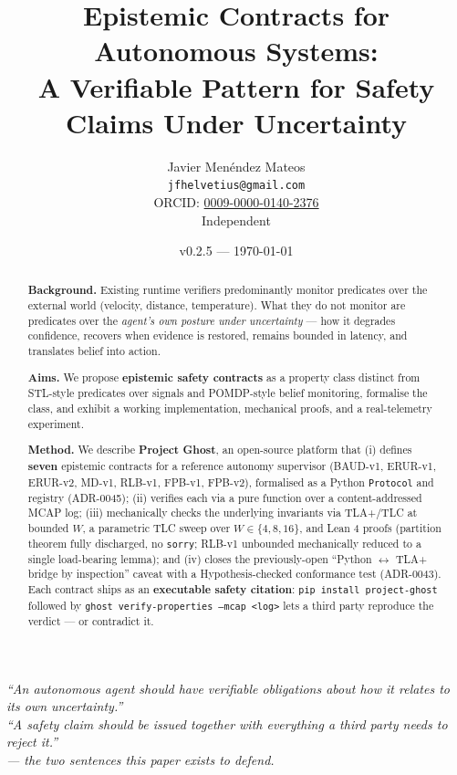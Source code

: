 \documentclass[11pt,a4paper]{article}
\title{Epistemic Contracts for Autonomous Systems:\\
       A Verifiable Pattern for Safety Claims Under Uncertainty}
\author{Javier Menéndez Mateos\\
        \texttt{jfhelvetius@gmail.com}\\
        \small ORCID: \href{https://orcid.org/0009-0000-0140-2376}{0009-0000-0140-2376}\\
        \small Independent}
\date{v0.2.5 --- \today}
\begin{document}
\maketitle

\begin{center}
\itshape\small
``An autonomous agent should have verifiable obligations about
how it relates to its own uncertainty.''\\[0.3em]
``A safety claim should be issued together with everything a third
party needs to reject it.''\\[0.3em]
\upshape\textmd{--- the two sentences this paper exists to defend.}
\end{center}

\vspace{1em}

\begin{abstract}
\noindent\textbf{Background.} Existing runtime verifiers
predominantly monitor predicates over the external world
(velocity, distance, temperature). What they do not monitor
are predicates over the \emph{agent's own posture under
uncertainty} --- how it degrades confidence, recovers when
evidence is restored, remains bounded in latency, and
translates belief into action.

\noindent\textbf{Aims.} We propose \textbf{epistemic safety
contracts} as a property class distinct from STL-style
predicates over signals and POMDP-style belief monitoring,
formalise the class, and exhibit a working implementation,
mechanical proofs, and a real-telemetry experiment.

\noindent\textbf{Method.} We describe \textbf{Project Ghost},
an open-source platform that (i) defines \textbf{seven}
epistemic contracts for a reference autonomy supervisor
(BAUD-v1, ERUR-v1, ERUR-v2, MD-v1, RLB-v1, FPB-v1, FPB-v2),
formalised as a Python \texttt{Protocol} and registry
(ADR-0045); (ii) verifies each via a pure function over a
content-addressed MCAP log; (iii) mechanically checks the
underlying invariants via TLA+/TLC at bounded $W$, a
parametric TLC sweep over $W \in \{4, 8, 16\}$, and Lean 4
proofs (partition theorem fully discharged, no \texttt{sorry};
RLB-v1 unbounded mechanically reduced to a single
load-bearing lemma); and (iv) closes the previously-open
``Python $\leftrightarrow$ TLA+ bridge by inspection'' caveat
with a Hypothesis-checked conformance test (ADR-0043). Each
contract ships as an \textbf{executable safety citation}:
\texttt{pip install project-ghost} followed by
\texttt{ghost verify-properties --mcap <log>} lets a third
party reproduce the verdict --- or contradict it.


\end{abstract}
\end{document}
